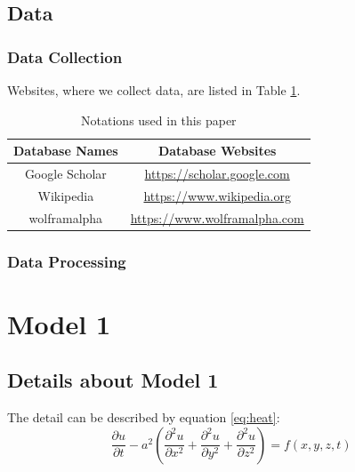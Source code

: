 \documentclass[12pt]{ctexart}
\begin{document}


\subsection{Data}
\subsubsection{Data Collection}
Websites, where we collect data, are listed in Table \ref{tb:data}.

\begin{table}[htbp]%
  \begin{center}
    \caption{Notations used in this paper}
    \begin{tabular}{c c}
      \toprule[1.5pt]
      \multicolumn{1}{m{5cm}}{\centering \textbf{Database Names}}
                     & \multicolumn{1}{m{10cm}}{\centering \textbf{Database Websites}}   \\
      \midrule
      Google Scholar & \href{https://scholar.google.com} {https://scholar.google.com}    \\
      Wikipedia      & \href{https://www.wikipedia.org}{https://www.wikipedia.org}       \\
      wolframalpha   & \href{https://www.wolframalpha.com}{https://www.wolframalpha.com} \\
      \bottomrule[1.5pt]
    \end{tabular}\label{tb:data}
  \end{center}
\end{table}
\vspace{-1cm}%
\subsubsection{Data Processing}
\section{Model 1}
\subsection{Details about Model 1}
The detail can be described by equation \eqref{eq:heat}:
\begin{equation}\label{eq:heat}
  \frac{\partial u}{\partial t} - a^2 \left( \frac{\partial^2 u}{\partial x^2} + \frac{\partial^2 u}{\partial y^2} + \frac{\partial^2 u}{\partial z^2} \right) = f(x, y, z, t)
\end{equation}
\end{document}

